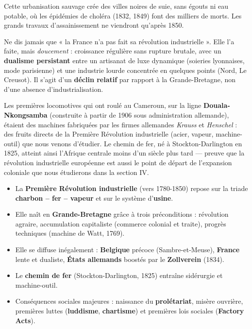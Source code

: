 \documentclass[11pt]{article}
\begin{document}
Cette urbanisation sauvage crée des villes noires de suie, sans égouts ni eau potable, où les épidémies de choléra (1832, 1849) font des milliers de morts. Les grands travaux d'assainissement ne viendront qu'après 1850.

\begin{attention}
Ne dis jamais que « la France n'a pas fait sa révolution industrielle ». Elle l'a faite, mais \emph{doucement} : croissance régulière sans rupture brutale, avec un \textbf{dualisme persistant} entre un artisanat de luxe dynamique (soieries lyonnaises, mode parisienne) et une industrie lourde concentrée en quelques points (Nord, Le Creusot). Il s'agit d'un \textbf{déclin relatif} par rapport à la Grande-Bretagne, non d'une absence d'industrialisation.
\end{attention}

\begin{savaistu}
Les premières locomotives qui ont roulé au Cameroun, sur la ligne \textbf{Douala-Nkongsamba} (construite à partir de 1906 sous administration allemande), étaient des machines fabriquées par les firmes allemandes \emph{Krauss} et \emph{Henschel} : des fruits directs de la Première Révolution industrielle (acier, vapeur, machine-outil) que nous venons d'étudier. Le chemin de fer, né à Stockton-Darlington en 1825, atteint ainsi l'Afrique centrale moins d'un siècle plus tard — preuve que la révolution industrielle européenne est aussi le point de départ de l'expansion coloniale que nous étudierons dans la section IV.
\end{savaistu}

\begin{aretenir}
\begin{itemize}
\item La \textbf{Première Révolution industrielle} (vers 1780-1850) repose sur la triade \textbf{charbon -- fer -- vapeur} et sur le système d'\textbf{usine}.
\item Elle naît en \textbf{Grande-Bretagne} grâce à trois préconditions : révolution agraire, accumulation capitaliste (commerce colonial et traite), progrès techniques (machine de Watt, 1769).
\item Elle se diffuse inégalement : \textbf{Belgique} précoce (Sambre-et-Meuse), \textbf{France} lente et dualiste, \textbf{États allemands} boostés par le \textbf{Zollverein} (1834).
\item Le \textbf{chemin de fer} (Stockton-Darlington, 1825) entraîne sidérurgie et machine-outil.
\item Conséquences sociales majeures : naissance du \textbf{prolétariat}, misère ouvrière, premières luttes (\textbf{luddisme}, \textbf{chartisme}) et premières lois sociales (\textbf{Factory Acts}).
\end{itemize}
\end{aretenir}
\end{document}
